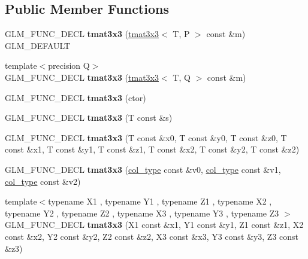 \subsection*{Public Member Functions}
\begin{DoxyCompactItemize}
\item 
\hypertarget{structglm_1_1tmat3x3_a0b809e3ca9e9a52ee512517df570a6d8}{G\-L\-M\-\_\-\-F\-U\-N\-C\-\_\-\-D\-E\-C\-L {\bfseries tmat3x3} (\hyperlink{structglm_1_1tmat3x3}{tmat3x3}$<$ T, P $>$ const \&m) G\-L\-M\-\_\-\-D\-E\-F\-A\-U\-L\-T}\label{structglm_1_1tmat3x3_a0b809e3ca9e9a52ee512517df570a6d8}

\item 
\hypertarget{structglm_1_1tmat3x3_a8b70a7497b9dc3aba4c12a7fa847b265}{{\footnotesize template$<$precision Q$>$ }\\G\-L\-M\-\_\-\-F\-U\-N\-C\-\_\-\-D\-E\-C\-L {\bfseries tmat3x3} (\hyperlink{structglm_1_1tmat3x3}{tmat3x3}$<$ T, Q $>$ const \&m)}\label{structglm_1_1tmat3x3_a8b70a7497b9dc3aba4c12a7fa847b265}

\item 
\hypertarget{structglm_1_1tmat3x3_a2cfa93a6deeb422adfffd7f9cfd35130}{G\-L\-M\-\_\-\-F\-U\-N\-C\-\_\-\-D\-E\-C\-L {\bfseries tmat3x3} (ctor)}\label{structglm_1_1tmat3x3_a2cfa93a6deeb422adfffd7f9cfd35130}

\item 
\hypertarget{structglm_1_1tmat3x3_a2def261a1a1122c019f295285a57bdf7}{G\-L\-M\-\_\-\-F\-U\-N\-C\-\_\-\-D\-E\-C\-L {\bfseries tmat3x3} (T const \&s)}\label{structglm_1_1tmat3x3_a2def261a1a1122c019f295285a57bdf7}

\item 
\hypertarget{structglm_1_1tmat3x3_ab75b2a141ae1bf92ffa010b177ce3eb5}{G\-L\-M\-\_\-\-F\-U\-N\-C\-\_\-\-D\-E\-C\-L {\bfseries tmat3x3} (T const \&x0, T const \&y0, T const \&z0, T const \&x1, T const \&y1, T const \&z1, T const \&x2, T const \&y2, T const \&z2)}\label{structglm_1_1tmat3x3_ab75b2a141ae1bf92ffa010b177ce3eb5}

\item 
\hypertarget{structglm_1_1tmat3x3_a600f68b1c8033fa18fb64fc3dfd5b6eb}{G\-L\-M\-\_\-\-F\-U\-N\-C\-\_\-\-D\-E\-C\-L {\bfseries tmat3x3} (\hyperlink{structglm_1_1tvec3}{col\-\_\-type} const \&v0, \hyperlink{structglm_1_1tvec3}{col\-\_\-type} const \&v1, \hyperlink{structglm_1_1tvec3}{col\-\_\-type} const \&v2)}\label{structglm_1_1tmat3x3_a600f68b1c8033fa18fb64fc3dfd5b6eb}

\item 
\hypertarget{structglm_1_1tmat3x3_aec731c2a1a80db526b22323c3c41cc40}{{\footnotesize template$<$typename X1 , typename Y1 , typename Z1 , typename X2 , typename Y2 , typename Z2 , typename X3 , typename Y3 , typename Z3 $>$ }\\G\-L\-M\-\_\-\-F\-U\-N\-C\-\_\-\-D\-E\-C\-L {\bfseries tmat3x3} (X1 const \&x1, Y1 const \&y1, Z1 const \&z1, X2 const \&x2, Y2 const \&y2, Z2 const \&z2, X3 const \&x3, Y3 const \&y3, Z3 const \&z3)}\label{structglm_1_1tmat3x3_aec731c2a1a80db526b22323c3c41cc40}


\end{DoxyCompactItemize}
